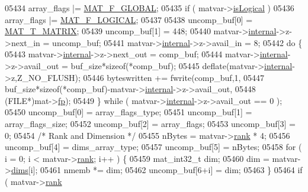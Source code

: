 \begin{DoxyCode}
{{{{{{{{{{{{{{{{{{{{{{{{{{{{{{{{05434             array\_flags |= \hyperlink{group___m_a_t_ggab9d6ef9e3ddca78a317b173f01d53fbba49084e0c796aa7963e53f7539525d40d}{MAT\_F\_GLOBAL};
05435         \textcolor{keywordflow}{if} ( matvar->\hyperlink{group___m_a_t_a866c1539e68073a837833d74cd4a65be}{isLogical} )
05436             array\_flags |= \hyperlink{group___m_a_t_ggab9d6ef9e3ddca78a317b173f01d53fbba57eb5c6e200bcbc0f1b7982f29a169c2}{MAT\_F\_LOGICAL};
05437 
05438         uncomp\_buf[0] = \hyperlink{group___m_a_t_ggacf7b3b879282b7ab3a51190e49bf3453a32985fee89a4df8db4b3f5d3a48823d3}{MAT\_T\_MATRIX};
05439         uncomp\_buf[1] = 448;
05440         matvar->\hyperlink{group___m_a_t_a6e97e3ed9f40c49322c18561c2a94e92}{internal}->z->next\_in  = uncomp\_buf;
05441         matvar->\hyperlink{group___m_a_t_a6e97e3ed9f40c49322c18561c2a94e92}{internal}->z->avail\_in = 8;
05442         \textcolor{keywordflow}{do} \{
05443             matvar->\hyperlink{group___m_a_t_a6e97e3ed9f40c49322c18561c2a94e92}{internal}->z->next\_out  = comp\_buf;
05444             matvar->\hyperlink{group___m_a_t_a6e97e3ed9f40c49322c18561c2a94e92}{internal}->z->avail\_out = buf\_size*\textcolor{keyword}{sizeof}(*comp\_buf);
05445             deflate(matvar->\hyperlink{group___m_a_t_a6e97e3ed9f40c49322c18561c2a94e92}{internal}->z,Z\_NO\_FLUSH);
05446             byteswritten += fwrite(comp\_buf,1,
05447                 buf\_size*\textcolor{keyword}{sizeof}(*comp\_buf)-matvar->\hyperlink{group___m_a_t_a6e97e3ed9f40c49322c18561c2a94e92}{internal}->z->avail\_out,
05448                 (FILE*)mat->\hyperlink{struct__mat__t_a85f562e407ca9ad4d2a6e14f839432b7}{fp});
05449         \} \textcolor{keywordflow}{while} ( matvar->\hyperlink{group___m_a_t_a6e97e3ed9f40c49322c18561c2a94e92}{internal}->z->avail\_out == 0 );
05450         uncomp\_buf[0] = array\_flags\_type;
05451         uncomp\_buf[1] = array\_flags\_size;
05452         uncomp\_buf[2] = array\_flags;
05453         uncomp\_buf[3] = 0;
05454         \textcolor{comment}{/* Rank and Dimension */}
05455         nBytes = matvar->\hyperlink{group___m_a_t_a84ba70c96ded13cc555fa75b768d9921}{rank} * 4;
05456         uncomp\_buf[4] = dims\_array\_type;
05457         uncomp\_buf[5] = nBytes;
05458         \textcolor{keywordflow}{for} ( i = 0; i < matvar->\hyperlink{group___m_a_t_a84ba70c96ded13cc555fa75b768d9921}{rank}; i++ ) \{
05459             mat\_int32\_t dim;
05460             dim = matvar->\hyperlink{group___m_a_t_a8e01234e1c862ce3472bb37f5a09b92c}{dims}[i];
05461             nmemb *= dim;
05462             uncomp\_buf[6+i] = dim;
05463         \}
05464         \textcolor{keywordflow}{if} ( matvar->\hyperlink{group___m_a_t_a84ba70c96ded13cc555fa75b768d9921}{rank} %
}}}}}}}}}}}}}}}}}}}}}}}}}}}}}}}}
\end{DoxyCode}
